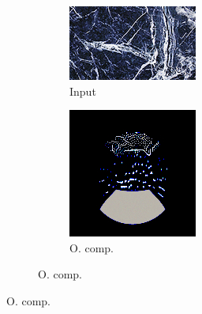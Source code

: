 \begin{figure}[]
\begin{subfigure}{\textwidth}
        \begin{subfigure}{0.19\textwidth}
            \centering
            \includegraphics[width=\textwidth]{images/04-experiment03/ball_marble_target.jpg}
            \caption{Input}
            \label{fig:ex03-ball_dof-marble-target}
        \end{subfigure}
        \hfill
        \begin{subfigure}{0.19\textwidth}
            \centering
            \includegraphics[width=\textwidth]{images/04-experiment03/ball_dof/marble/stats_im.jpg}
            \caption{O. comp.}
            \label{fig:ex03-ball_dof-marble-stats_im}

\end{subfigure}
\end{subfigure}
\end{figure}
